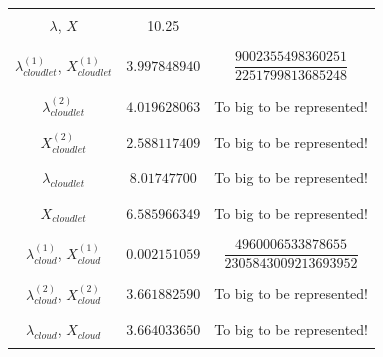 \documentclass[10pt,a4paper]{article}
\begin{document}
\begin{table}[h!]
\begin{adjustbox}{center=\textwidth}
\begin{tabular}{c|c|c}
	 &&\\\hline &&\\

	 $\lambda$, $X$ & 10.25 & \\
	 
	 &&\\\hline &&\\
	
	 $\lambda_{cloudlet}^{(1)}$, $X_{cloudlet}^{(1)}$ & $3.997848940$ & $\dfrac{9002355498360251}{2251799813685248}$ \\
	 
	 &&\\\hline &&\\
	 
	 $\lambda_{cloudlet}^{(2)}$ & $4.019628063$ & To big to be represented! \\
	 
	 &&\\\hline &&\\	 
	 
	 $X_{cloudlet}^{(2)}$ & $2.588117409$ & To big to be represented! \\
	 
	 &&\\\hline &&\\
	 
	 $\lambda_{cloudlet}$ & $8.01747700$ & To big to be represented! \\
	 
	 &&\\\hline &&\\
	 
	 $X_{cloudlet}$ & $6.585966349$ & To big to be represented! \\
	 
	 &&\\\hline &&\\
	
	 $\lambda_{cloud}^{(1)}$, $X_{cloud}^{(1)}$ & $0.002151059$ & $\dfrac{4960006533878655}{2305843009213693952}$ \\

	 &&\\\hline &&\\
	
	 $\lambda_{cloud}^{(2)}$, $X_{cloud}^{(2)}$ & $3.661882590$ &  To big to be represented! \\

	 &&\\\hline &&\\
	
	 $\lambda_{cloud}$, $X_{cloud}$ & $3.664033650$ &  To big to be represented! \\
  
     &&\\


     \bottomrule

    \end{tabular}
    \end{adjustbox}
\end{table}
\end{document}
